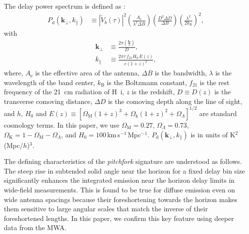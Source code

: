 \documentclass[preprint2,apjl,numberedappendix,twocolappendix,appendixfloats]{emulateapj}
\begin{document}
The delay power spectrum is defined as \citep[][Paper~I]{par12a}:
\begin{align}\label{eqn:delay-power-spectrum}
  P_\textrm{d}(\boldsymbol{k}_\perp,k_\parallel) &\equiv |\tilde{V}_b(\tau)|^2\left(\frac{A_\textrm{e}}{\lambda^2\Delta B}\right)\left(\frac{D^2\Delta D}{\Delta B}\right)\left(\frac{\lambda^2}{2k_\textrm{B}}\right)^2,
\end{align}
with
\begin{align}
  \boldsymbol{k}_\perp &\equiv \frac{2\pi(\frac{\boldsymbol{b}}{\lambda})}{D}, \\
  k_\parallel &\equiv \frac{2\pi\tau\,f_{21}H_0\,E(z)}{c(1+z)^2}, 
\end{align}
where, $A_\textrm{e}$ is the effective area of the antenna, $\Delta B$ is the bandwidth, $\lambda$ is the wavelength of the band center, $k_\textrm{B}$ is the Boltzmann constant, $f_{21}$ is the rest frequency of the 21~cm radiation of H~{\sc i}, $z$ is the redshift, $D\equiv D(z)$ is the transverse comoving distance, $\Delta D$ is the comoving depth along the line of sight, and $h$, $H_0$ and $E(z)\equiv [\Omega_\textrm{M}(1+z)^3+\Omega_\textrm{k}(1+z)^2+\Omega_\Lambda]^{1/2}$ are standard cosmology terms. In this paper, we use $\Omega_\textrm{M}=0.27$, $\Omega_\Lambda=0.73$, $\Omega_\textrm{K}=1-\Omega_\textrm{M}-\Omega_\Lambda$, and $H_0=100\,$km$\,$s$^{-1}\,$Mpc$^{-1}$. $P_\textrm{d}(\boldsymbol{k}_\perp,k_\parallel)$ is in units of K$^2$(Mpc/$h$)$^3$.

The defining characteristics of the {\it pitchfork} signature are understood as follows. The steep rise in subtended solid angle near the horizon for a fixed delay bin size significantly enhances the integrated emission near the horizon delay limits in wide-field measurements. This is found to be true for diffuse emission even on wide antenna spacings because their foreshortening towards the horizon makes them sensitive to large angular scales that match the inverse of their foreshortened lengths. In this paper, we confirm this key feature using deeper data from the MWA.

\end{document}
